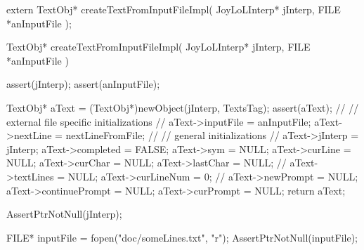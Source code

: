 \startCHeader
extern TextObj* createTextFromInputFileImpl(
  JoyLoLInterp* jInterp,
  FILE *anInputFile
);
\stopCHeader
{}

\startCCode
TextObj* createTextFromInputFileImpl(
  JoyLoLInterp* jInterp,
  FILE *anInputFile
) {
  assert(jInterp);
  assert(anInputFile);
  
  TextObj* aText = (TextObj*)newObject(jInterp, TextsTag);
  assert(aText);
  //
  // external file specific initializations
  //
  aText->inputFile  = anInputFile;
  aText->nextLine   = nextLineFromFile;
  //
  // general initializations
  //
  aText->jInterp    = jInterp;
  aText->completed  = FALSE;
  aText->sym        = NULL;
  aText->curLine    = NULL;
  aText->curChar    = NULL;
  aText->lastChar   = NULL;
  //
  aText->textLines  = NULL;
  aText->curLineNum = 0;
  //
  aText->newPrompt      = NULL;
  aText->continuePrompt = NULL;
  aText->curPrompt      = NULL;
  return aText;
}
\stopCCode

\startCTest
  AssertPtrNotNull(jInterp);

  FILE* inputFile = fopen("doc/someLines.txt", "r");
  AssertPtrNotNull(inputFile);
  
